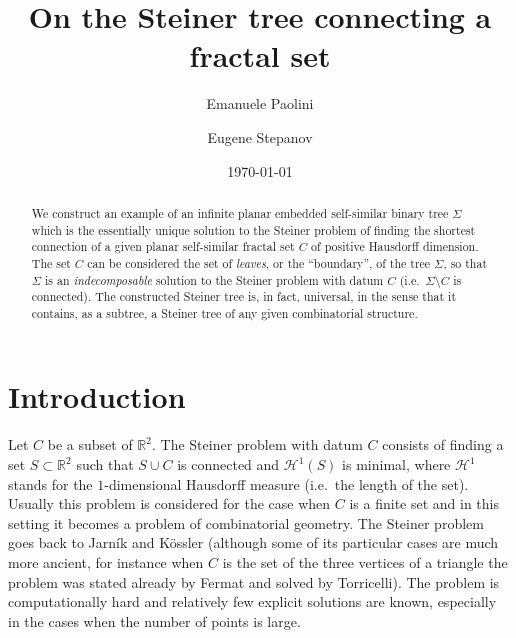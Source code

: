 \documentclass{amsart}
\author[Paolini]{Emanuele Paolini}
\author[Stepanov]{Eugene Stepanov}
\date{\today}
\title{On the Steiner tree connecting a fractal set}
\newcommand{\RR}{\mathbb R}
\renewcommand{\H}{\mathcal H}
\renewcommand{\H}{\mathcal{H}}
\theoremstyle{definition}
\theoremstyle{remark}
\begin{document}
\begin{abstract}
We construct an example of an infinite planar embedded self-similar binary tree  
$\Sigma$ which is the essentially unique solution to the Steiner problem of finding 
the shortest connection of a given planar self-similar fractal set $C$
of positive Hausdorff dimension.
The set $C$ can be considered the set of \emph{leaves}, or the ``boundary'',
of the tree $\Sigma$,
so that $\Sigma$ is an \emph{indecomposable} solution to the Steiner problem
with datum $C$ (i.e.\ $\Sigma\setminus C$ is connected).
The constructed Steiner tree is, in fact, universal, in the sense that 
it contains, as a subtree, a Steiner tree of any given combinatorial structure.
\end{abstract}

\maketitle

\section{Introduction}

Let $C$ be a subset of $\RR^2$.
The Steiner problem with datum $C$ consists of finding a set $S\subset \RR^2$ 
such that $S\cup C$ is connected and $\H^1(S)$ is minimal, where $\H^1$ stands 
for the $1$-dimensional Hausdorff measure (i.e.\ the length of the set).
Usually this problem is considered for the case when $C$ is a finite 
set and in this setting it becomes a problem of combinatorial geometry. 
The Steiner problem goes back to Jarník and Kössler \cite{JarKos34} 
(although some of its particular cases are much more ancient, for instance 
when $C$ is the set of the three vertices of a triangle the problem was 
stated already by Fermat and solved by Torricelli).
The problem is computationally hard and relatively few explicit solutions 
are known, especially in the cases when the number of points is large.
\end{document}
